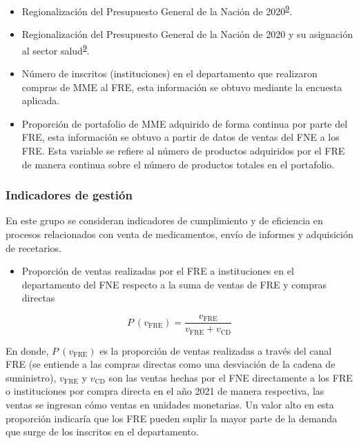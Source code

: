\documentclass[
]{book}
\providecommand{\tightlist}{%
  \setlength{\itemsep}{0pt}\setlength{\parskip}{0pt}}
\begin{document}
\begin{itemize}
\item
  Regionalización del Presupuesto General de la Nación de 2020\textsuperscript{\protect\hyperlink{ref-DepartamentoNacionaldePlaneacion2019}{9}}.
\item
  Regionalización del Presupuesto General de la Nación de 2020 y su asignación al sector salud\textsuperscript{\protect\hyperlink{ref-DepartamentoNacionaldePlaneacion2019}{9}}.
\item
  Número de inscritos (instituciones) en el departamento que realizaron compras de MME al FRE, esta información se obtuvo mediante la encuesta aplicada.
\item
  Proporción de portafolio de MME adquirido de forma continua por parte del FRE, esta información se obtuvo a partir de datos de ventas del FNE a los FRE. Esta variable se refiere al número de productos adquiridos por el FRE de manera continua sobre el número de productos totales en el portafolio.
\end{itemize}

\hypertarget{indicadores-de-gestiuxf3n}{%
\subsubsection{Indicadores de gestión}\label{indicadores-de-gestiuxf3n}}

En este grupo se consideran indicadores de cumplimiento y de eficiencia en procesos relacionados con venta de medicamentos, envío de informes y adquisición de recetarios.

\begin{itemize}
\tightlist
\item
  Proporción de ventas realizadas por el FRE a instituciones en el departamento del FNE respecto a la suma de ventas de FRE y compras directas
\end{itemize}

\[P~\left(v_{\mathrm{FRE}}\right) = \frac{v_{\mathrm{FRE}} }{v_{\mathrm{FRE}} + v_{\mathrm{CD}}}\]

En donde, \(P~\left(v_{\mathrm{FRE}}\right)\) es la proporción de ventas realizadas a través del canal FRE (se entiende a las compras directas como una desviación de la cadena de suministro), \(v_{\mathrm{FRE}}\) y \(v_{\mathrm{CD}}\) son las ventas hechas por el FNE directamente a los FRE o instituciones por compra directa en el año 2021 de manera respectiva, las ventas se ingresan cómo ventas en unidades monetarias. Un valor alto en esta proporción indicaría que los FRE pueden suplir la mayor parte de la demanda que surge de los inscritos en el departamento.
\end{document}
